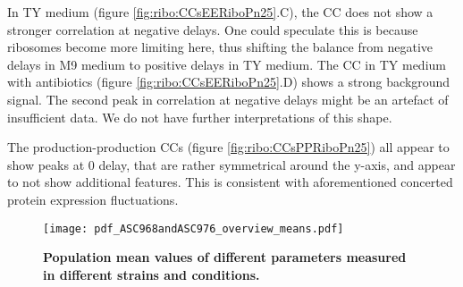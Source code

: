 In TY medium (figure \ref{fig:ribo:CCsEERiboPn25}.C), the CC does not show a stronger correlation at negative delays.
%
One could speculate this is because ribosomes become more limiting here, thus shifting the balance from negative delays in M9 medium to positive delays in TY medium.
%
The CC in TY medium with antibiotics (figure \ref{fig:ribo:CCsEERiboPn25}.D) shows a strong background signal.
The second peak in correlation at negative delays might be an artefact of insufficient data.
We do not have further interpretations of this shape.

The production-production CCs (figure \ref{fig:ribo:CCsPPRiboPn25}) all appear to show peaks at 0 delay, that are rather symmetrical around the y-axis, and appear to not show additional features.
This is consistent with aforementioned concerted protein expression fluctuations.



\begin{figure}
    \centering
    \texttt{[image: pdf\_ASC968andASC976\_overview\_means.pdf]}
    \caption{ 
        \textbf{Population mean values of different parameters measured in different strains and conditions.}
    }
    \label{fig:ribo:meansPn25R}
\end{figure}


